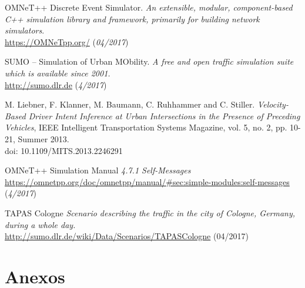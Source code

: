 \documentclass[11pt,letterpaper]{article}
\begin{document}
\begin{thebibliography}{5}
  		 OMNeT++ Discrete Event Simulator.
  		\textit{An extensible, modular, component-based C++ simulation library and framework, primarily for building network simulators}.
  		\\\url{https://OMNeTpp.org/} (\textit{04/2017})

  		 SUMO – Simulation of Urban MObility.
  		\textit{A free and open traffic simulation suite which is available since 2001.}
  		\\\url{http://sumo.dlr.de} (\textit{4/2017})

       M. Liebner, F. Klanner, M. Baumann, C. Ruhhammer and C. Stiller.
      \textit{Velocity-Based Driver Intent Inference at Urban Intersections in the Presence of Preceding Vehicles},
      IEEE Intelligent Transportation Systems Magazine, vol. 5, no. 2, pp. 10-21, Summer 2013.
      \\doi: 10.1109/MITS.2013.2246291

	   OMNeT++ Simulation Manual
	  \textit{4.7.1 Self-Messages}
	  \\\url{https://omnetpp.org/doc/omnetpp/manual/#sec:simple-modules:self-messages} (\textit{4/2017})

	   TAPAS Cologne
	  \textit{Scenario describing the traffic in the city of Cologne, Germany, during a whole day.}
	  \\\url{http://sumo.dlr.de/wiki/Data/Scenarios/TAPASCologne} (04/2017)

\end{thebibliography}
\newpage
\section{Anexos}
\end{document}
